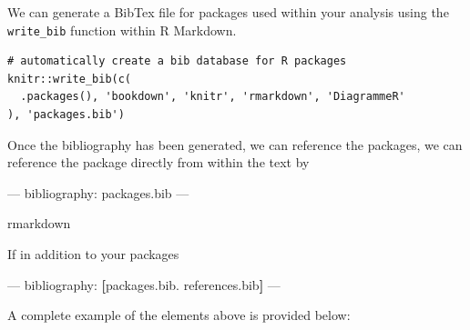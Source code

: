 \documentclass[]{book}
\newenvironment{Shaded}{\begin{snugshade}}{\end{snugshade}}
\newcommand{\KeywordTok}[1]{\textcolor[rgb]{0.13,0.29,0.53}{\textbf{#1}}}
\newcommand{\OtherTok}[1]{\textcolor[rgb]{0.56,0.35,0.01}{#1}}
\newcommand{\FunctionTok}[1]{\textcolor[rgb]{0.00,0.00,0.00}{#1}}
\newcommand{\AttributeTok}[1]{\textcolor[rgb]{0.77,0.63,0.00}{#1}}
\newcommand{\NormalTok}[1]{#1}
\begin{document}
We can generate a BibTex file for packages used within your analysis
using the \texttt{write\_bib} function within R Markdown.

\begin{verbatim}
# automatically create a bib database for R packages
knitr::write_bib(c(
  .packages(), 'bookdown', 'knitr', 'rmarkdown', 'DiagrammeR'
), 'packages.bib')
\end{verbatim}

Once the bibliography has been generated, we can reference the packages,
we can reference the package directly from within the text by

\begin{Shaded}
\begin{Highlighting}[]
\OtherTok{---}
\FunctionTok{bibliography:}\AttributeTok{ packages.bib}
\OtherTok{---}
\end{Highlighting}
\end{Shaded}

rmarkdown

If in addition to your packages

\begin{Shaded}
\begin{Highlighting}[]
\OtherTok{---}
\FunctionTok{bibliography:}\AttributeTok{ }\KeywordTok{[}\NormalTok{packages.bib. references.bib}\KeywordTok{]}
\OtherTok{---}
\end{Highlighting}
\end{Shaded}

A complete example of the elements above is provided below:


\end{document}

